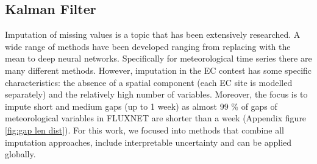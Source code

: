 \documentclass{article}
\let\Oldsubsection\subsection
\renewcommand{\subsection}{\FloatBarrier\Oldsubsection}
\begin{document}
\subsection{Kalman Filter}
Imputation of missing values is a topic that has been extensively researched. A wide range of methods have been developed ranging from replacing with the mean to deep neural networks. Specifically for meteorological time series there are many different methods. However, imputation in the EC contest has some specific characteristics: the absence of a spatial component (each EC site is modelled separately) and the relatively high number of variables. Moreover, the focus is to impute short and medium gaps (up to 1 week) as almost 99 \% of gaps of meteorological variables in FLUXNET are shorter than a week (Appendix figure \ref{fig:gap len dist}). For this work, we focused into methods that combine all imputation approaches, include interpretable uncertainty and can be applied globally. 
\end{document}

